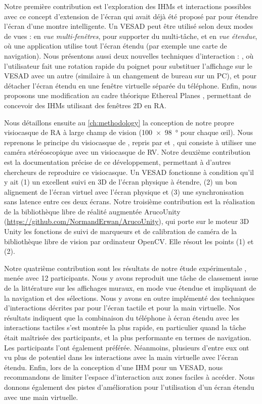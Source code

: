 Notre première contribution est l'exploration des IHMs et interactions possibles avec ce concept d'extension de l'écran  qui avait déjà été proposé par \cite{Grubert2015} pour étendre l'écran d'une montre intelligente. Un VESAD peut être utilisé selon deux modes de vues : en \emph{vue multi-fenêtres}, pour supporter du multi-tâche, et en \emph{vue étendue}, où une application utilise tout l'écran étendu (par exemple une carte de navigation). Nous présentons aussi deux nouvelles techniques d'interaction : , où l'utilisateur fait une rotation rapide du poignet pour substituer l'affichage sur le VESAD avec un autre (similaire à un changement de bureau sur un PC), et  pour détacher l'écran étendu en une fenêtre virtuelle séparée du téléphone. Enfin, nous proposons une modification au cadre théorique Ethereal Planes \citep{Ens2014a}, permettant de concevoir des IHMs utilisant des fenêtres 2D en RA.

Nous détaillons ensuite au \autoref{ch:methodology} la conception de notre propre visiocasque de RA à large champ de vision (\SI{100x98}{\degree} pour chaque \oe il). Nous reprenons le principe du visiocasque de \cite{Steptoe2013}, repris par \cite{Steptoe2014} et \cite{Piumsomboon2014}, qui consiste à utiliser une caméra stéréoscopique  avec un visiocasque de RV. Notre deuxième contribution est la documentation précise de ce développement, permettant à d'autres chercheurs de reproduire ce visiocasque. Un VESAD fonctionne à condition qu'il y ait (1) un excellent suivi en 3D de l'écran physique à étendre, (2) un bon alignement de l'écran virtuel avec l'écran physique et (3) une synchronisation sans latence entre ces deux écrans. Notre troisième contribution est la réalisation de la bibliothèque libre de réalité augmentée ArucoUnity (\url{https://github.com/NormandErwan/ArucoUnity}), qui porte sur le moteur 3D Unity les fonctions de suivi de marqueurs et de calibration de caméra de la bibliothèque libre de vision par ordinateur OpenCV. Elle résout les points (1) et (2).

Notre quatrième contribution sont les résultats de notre étude expérimentale , menée avec 12 participants. Nous y avons reproduit une tâche de classement issue de la littérature sur les affichages muraux, en mode vue étendue et impliquant de la navigation et des sélections. Nous y avons en outre implémenté des techniques d'interactions décrites par \cite{Wobbrock2009} pour l'écran tactile et \cite{Piumsomboon2013} pour la main virtuelle. Nos résultats indiquent que la combinaison du téléphone à écran étendu avec les interactions tactiles s'est montrée la plus rapide, en particulier quand la tâche était maîtrisée des participants, et la plus performante en termes de navigation. Les participants l'ont également préférée. Néanmoins, plusieurs d'entre eux ont vu plus de potentiel dans les interactions avec la main virtuelle avec l'écran étendu. Enfin, lors de la conception d'une IHM pour un VESAD, nous recommandons de limiter l'espace d'interaction aux zones faciles à accéder. Nous donnons également des pistes d'amélioration pour l'utilisation d'un écran étendu avec une main virtuelle.

